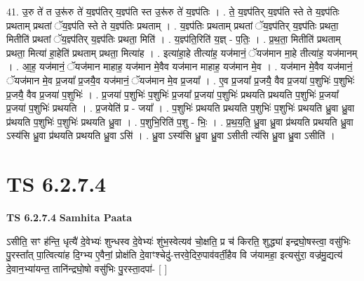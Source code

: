 \documentclass[17pt]{extarticle}
\begin{document}
41. उ॒रु ते॑ त उ॒रू॑रु ते॑ य॒ज्ञ्प॑तिर् य॒ज्ञ्प॑ति स्त उ॒रू॑रु ते॑ य॒ज्ञ्प॑तिः । . ते॒ य॒ज्ञ्प॑तिर् य॒ज्ञ्प॑ति स्ते ते य॒ज्ञ्प॑तिः प्रथताम् प्रथतां ॅय॒ज्ञ्प॑ति स्ते ते य॒ज्ञ्प॑तिः प्रथताम् । . य॒ज्ञ्प॑तिः प्रथताम् प्रथतां ॅय॒ज्ञ्प॑तिर् य॒ज्ञ्प॑तिः प्रथता॒ मितीति॑ प्रथतां ॅय॒ज्ञ्प॑तिर् य॒ज्ञ्प॑तिः प्रथता॒ मिति॑ । . य॒ज्ञ्प॑ति॒रिति॑ य॒ज्ञ् - प॒तिः॒ । . प्र॒थ॒ता॒ मितीति॑ प्रथताम् प्रथता॒ मित्या॑ हा॒हेति॑ प्रथताम् प्रथता॒ मित्या॑ह । . इत्या॑हा॒हे तीत्या॑ह॒ यज॑मानं॒ ॅयज॑मान मा॒हे तीत्या॑ह॒ यज॑मानम् । . आ॒ह॒ यज॑मानं॒ ॅयज॑मान माहाह॒ यज॑मान मे॒वैव यज॑मान माहाह॒ यज॑मान मे॒व । . यज॑मान मे॒वैव यज॑मानं॒ ॅयज॑मान मे॒व प्र॒जया᳚ प्र॒जयै॒व यज॑मानं॒ ॅयज॑मान मे॒व प्र॒जया᳚ । . ए॒व प्र॒जया᳚ प्र॒जयै॒ वैव प्र॒जया॑ प॒शुभिः॑ प॒शुभिः॑ प्र॒जयै॒ वैव प्र॒जया॑ प॒शुभिः॑ । . प्र॒जया॑ प॒शुभिः॑ प॒शुभिः॑ प्र॒जया᳚ प्र॒जया॑ प॒शुभिः॑ प्रथयति प्रथयति प॒शुभिः॑ प्र॒जया᳚ प्र॒जया॑ प॒शुभिः॑ प्रथयति । . प्र॒जयेति॑ प्र - जया᳚ । . प॒शुभिः॑ प्रथयति प्रथयति प॒शुभिः॑ प॒शुभिः॑ प्रथयति ध्रु॒वा ध्रु॒वा प्र॑थयति प॒शुभिः॑ प॒शुभिः॑ प्रथयति ध्रु॒वा । . प॒शुभि॒रिति॑ प॒शु - भिः॒ । . प्र॒थ॒य॒ति॒ ध्रु॒वा ध्रु॒वा प्र॑थयति प्रथयति ध्रु॒वा ऽस्य॑सि ध्रु॒वा प्र॑थयति प्रथयति ध्रु॒वा ऽसि॑ । . ध्रु॒वा ऽस्य॑सि ध्रु॒वा ध्रु॒वा ऽसीती त्य॑सि ध्रु॒वा ध्रु॒वा ऽसीति॑ । \newline
\pagebreak
{}

\section{ TS 6.2.7.4 }

\textbf{TS 6.2.7.4 } \newline
\textbf{Samhita Paata} \newline

ऽसीति॒ सꣳ ह॑न्ति॒ धृत्यै॑ दे॒वेभ्यः॑ शुन्धस्व दे॒वेभ्यः॑ शुंभ॒स्वेत्यव॑ चो॒क्षति॒ प्र च॑ किरति॒ शुद्ध्या॑ इन्द्रघो॒षस्त्वा॒ वसु॑भिः पु॒रस्ता᳚त् पा॒त्वित्या॑ह दि॒ग्भ्य ए॒वैनां॒ प्रोक्ष॑ति दे॒वाꣳश्चेदु॑-त्तरवे॒दिरु॒पाव॑वर्ती॒हैव वि ज॑यामहा॒ इत्यसु॑रा॒ वज्र॑मु॒द्यत्य॑ दे॒वान॒भ्या॑यन्त॒ तानि॑न्द्रघो॒षो वसु॑भिः पु॒रस्ता॒दपा॑- [  ] \newline
\end{document}
